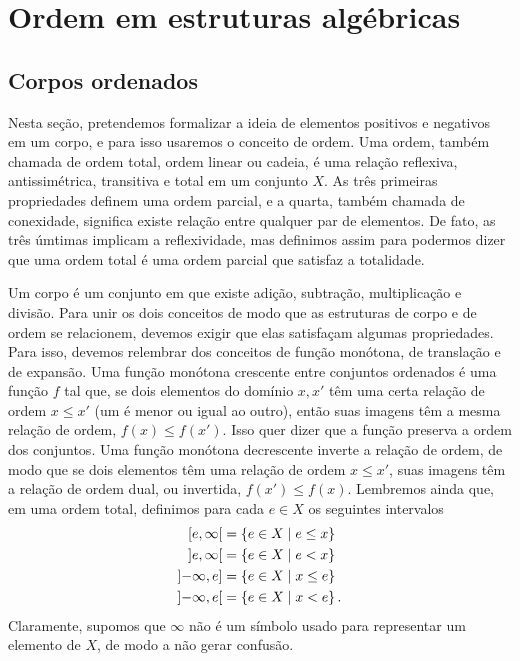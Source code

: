 \chapter{Ordem em estruturas algébricas}


\section{Corpos ordenados}

Nesta seção, pretendemos formalizar a ideia de elementos positivos e negativos em um corpo, e para isso usaremos o conceito de ordem. Uma ordem, também chamada de ordem total, ordem linear ou cadeia, é uma relação reflexiva, antissimétrica, transitiva e total em um conjunto $X$. As três primeiras propriedades definem uma ordem parcial, e a quarta, também chamada de conexidade, significa existe relação entre qualquer par de elementos. De fato, as três úmtimas implicam a reflexividade, mas definimos assim para podermos dizer que uma ordem total é uma ordem parcial que satisfaz a totalidade.

Um corpo é um conjunto em que existe adição, subtração, multiplicação e divisão. Para unir os dois conceitos de modo que as estruturas de corpo e de ordem se relacionem, devemos exigir que elas satisfaçam algumas propriedades. Para isso, devemos relembrar dos conceitos de função monótona, de translação e de expansão. Uma função monótona crescente entre conjuntos ordenados é uma função $f$ tal que, se dois elementos do domínio $x,x'$ têm uma certa relação de ordem $x \leq x'$  (um é menor ou igual ao outro), então suas imagens têm a mesma relação de ordem, $f(x) \leq f(x')$. Isso quer dizer que a função preserva a ordem dos conjuntos. Uma função monótona decrescente inverte a relação de ordem, de modo que se dois elementos têm uma relação de ordem $x \leq x'$, suas imagens têm a relação de ordem dual, ou invertida, $f(x') \leq f(x)$. Lembremos ainda que, em uma ordem total, definimos para cada $e \in X$ os seguintes intervalos
	\begin{align*}
	\left[{e},{\infty}\right[ &= \left\{{e \in X}\;\middle\vert\;{e \leq x}\right\} \\
	\left]{e},{\infty}\right[ &= \left\{{e \in X}\;\middle\vert\;{e < x}\right\} \\
	\left]{-\infty},{e}\right] &= \left\{{e \in X}\;\middle\vert\;{x \leq e}\right\} \\
	\left]{-\infty},{e}\right[ &= \left\{{e \in X}\;\middle\vert\;{x < e}\right\}.
	\end{align*}
Claramente, supomos que $\infty$ não é um símbolo usado para representar um elemento de $X$, de modo a não gerar confusão.

